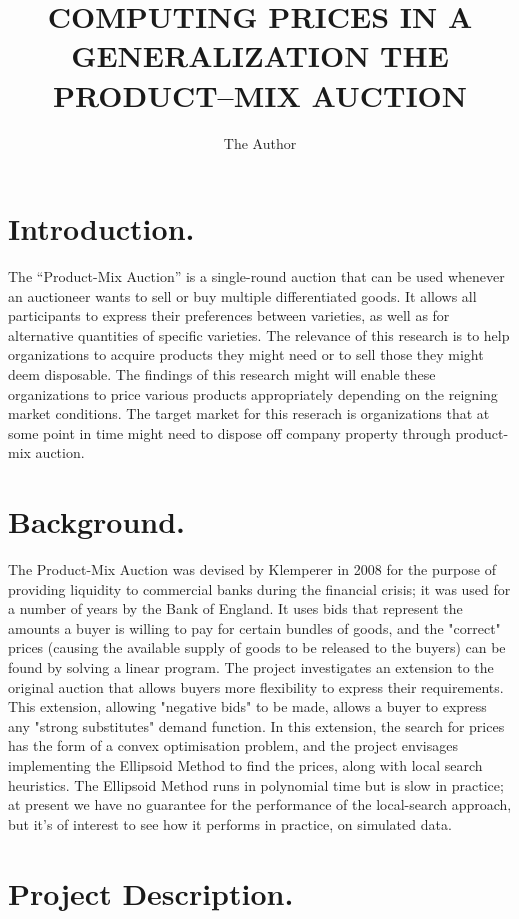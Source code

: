 \documentclass[11pt]{article} %
\title{COMPUTING PRICES IN A GENERALIZATION THE PRODUCT–MIX AUCTION}
\author{The Author}
\begin{document}
\maketitle

\section{Introduction.}

The “Product-Mix Auction” is a single-round auction that can be used whenever an auctioneer wants to sell or buy multiple differentiated goods. It allows all participants to express their preferences between varieties, as well as for alternative quantities of specific varieties.
The relevance of this research is to help organizations to acquire products they might need or to sell those they might deem disposable. The findings of this research might will enable these organizations to price various products appropriately depending on the reigning market conditions. The target market for this reserach is organizations that at some point in time might need to dispose off company property through product-mix auction.

\section{Background.}
The Product-Mix Auction was devised by Klemperer in 2008 for the purpose of providing liquidity to commercial banks during the financial crisis; it was used for a number of years by the Bank of England.
It uses bids that represent the amounts a buyer is willing to pay for certain bundles of goods, and the "correct" prices (causing the available supply of goods to be released to the buyers) can be found by solving a linear program. The project investigates an extension to the original auction that allows buyers more flexibility to express their requirements. This extension, allowing "negative bids" to be made, allows a buyer to express any "strong substitutes" demand function. In this extension, the search for prices has the form of a convex optimisation problem, and the project envisages implementing the Ellipsoid Method to find the prices, along with local search heuristics. The Ellipsoid Method runs in polynomial time but is slow in practice; at present we have no guarantee for the performance of the local-search approach, but it's of interest to see how it performs in practice, on simulated data.


\section{Project Description.}
\end{document}

